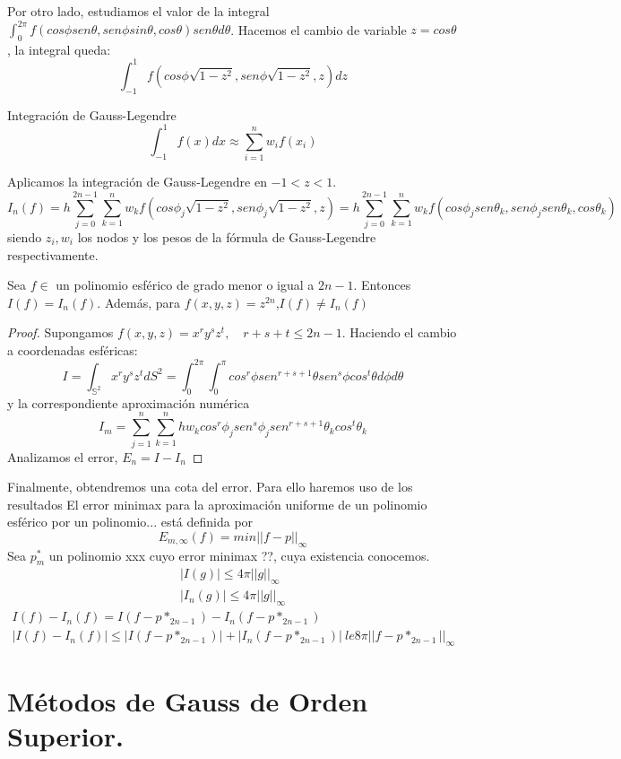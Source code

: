 Por otro lado, estudiamos el valor de la integral $\int_{0}^{2\pi} f(cos\phi sen\theta,sen\phi sin\theta,cos\theta)sen\theta d\theta$. Hacemos el cambio de variable $z= cos\theta$, la integral queda:
$$
\int_{-1}^{1} f(cos\phi\sqrt{1-z^2},sen \phi\sqrt{1-z^2},z) dz 
$$
\begin{rem}Integración de Gauss-Legendre
	$$
	\int_{-1}^{1}f(x)dx \approx \sum_{i=1}^{n} w_if(x_i)
	$$
\end{rem}
Aplicamos la integración de Gauss-Legendre en $-1<z<1$.
$$
I_n(f) = h \sum_{j=0}^{2n-1} \sum_{k=1}^{n} w_k f(cos \phi_j\sqrt{1-z^2}, sen\phi_j\sqrt{1-z^2},z) = h \sum_{j=0}^{2n-1} \sum_{k=1}^{n} w_k f(cos \phi_jsen\theta_k, sen\phi_jsen\theta_k,cos\theta_k)
$$
siendo ${z_i},{w_i}$ los nodos y los pesos de la fórmula de Gauss-Legendre respectivamente.
\begin{thm}Sea $f\in$ un polinomio esférico de grado menor o igual a $2n-1$. Entonces $I(f)=I_n(f)$. Además, para $f(x,y,z) = z^{2n}$,$I(f)\neq I_n(f)$
 	
\end{thm}
\begin{proof}
	
	Supongamos $f(x,y,z)= x^ry^sz^t, \quad r+s+t \le 2n-1$. Haciendo el cambio a coordenadas esféricas:
	$$
	I = \int_{\mathds{S}^2} x^ry^sz^t dS^2 = \int_{0}^{2\pi} \int_{0}^{\pi} cos^r\phi sen^{r+s+1}\theta sen^s \phi cos^t \theta d\phi d\theta
	$$
	y la correspondiente aproximación numérica
	$$
	I_m = \sum_{j=1}^{n} \sum_{k=1}^{n} h w_k cos^r \phi_j sen^s \phi_j sen^{r+s+1}\theta_k cos^t \theta_k
	$$
	Analizamos el error, $ E_n = I-I_n $
\end{proof}
Finalmente, obtendremos una cota del error. Para ello haremos uso de los resultados %
\medskip
El error minimax para la aproximación uniforme de un polinomio esférico por un polinomio... está definida por
$$
E_{m,\infty}(f) = min ||f-p||_{\infty}
$$
Sea $p_m^*$ un polinomio xxx cuyo error minimax ??, cuya existencia conocemos.
\begin{gather}
|I(g)| \le 4\pi||g||_\infty \\
|I_n(g)|\le 4\pi||g||_\infty
\end{gather}
\begin{gather}
I(f) - I_n(f) = I(f-p*_{2n-1}) - I_n(f-p*_{2n-1}) \\
|I(f) - I_n(f)| \le | I(f-p*_{2n-1}) | + |  I_n(f-p*_{2n-1}) | \ le 8\pi||f-p*_{2n-1}||_\infty
\end{gather}
\section{Métodos de Gauss de Orden Superior.}

